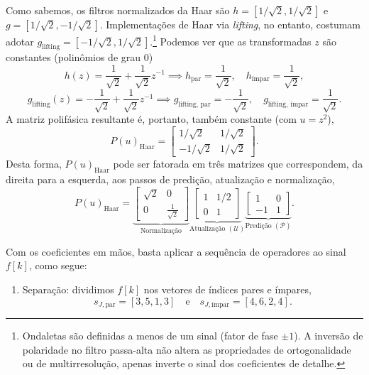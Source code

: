 \begin{example}
    Como sabemos, os filtros normalizados da Haar são \(h = [1/\sqrt{2}, 1/\sqrt{2}]\) e \(g = [1/\sqrt{2}, -1/\sqrt{2}]\). 
    Implementações de Haar via \emph{lifting}, no entanto, costumam adotar \(g_{\text{lifting}} = [- 1/\sqrt{2}, 1/\sqrt{2}]\).\footnote{Ondaletas são definidas a menos de um sinal (fator de fase \(\pm 1\)). A inversão de polaridade no filtro passa-alta não altera as propriedades de ortogonalidade ou de multirresolução, apenas inverte o sinal dos coeficientes de detalhe.} Podemos ver que as transformadas \(z\) são constantes (polinômios de grau 0)
		\[ 
            h(z) = \frac{1}{\sqrt{2}} + \frac{1}{\sqrt{2}}z^{-1} \implies h_\text{par} = \frac{1}{\sqrt{2}}, \quad h_\text{ímpar} = \frac{1}{\sqrt{2}},
        \]
		\[ 
            g_{\text{lifting}}(z) = -\frac{1}{\sqrt{2}} + \frac{1}{\sqrt{2}}z^{-1} \implies g_\text{lifting, par} = - \frac{1}{\sqrt{2}}, \quad g_\text{lifting, ímpar} = \frac{1}{\sqrt{2}}. 
        \]
A matriz polifásica resultante é, portanto, também constante (com \(u=z^2\)),
	\[
        P(u)_{\text{Haar}} = \begin{bmatrix}
        1/\sqrt{2} & 1/\sqrt{2} \\
        -1/\sqrt{2} & 1/\sqrt{2}
        \end{bmatrix}.
    \]
Desta forma, \(P(u)_{\text{Haar}}\) pode ser fatorada em três matrizes que correspondem, da direita para a esquerda, aos passos de predição, atualização e normalização,
\begin{equation*}
        P(u)_{\text{Haar}} = \underbrace{\begin{bmatrix} \sqrt{2} & 0 \\ 0 & \frac{1}{\sqrt{2}} \end{bmatrix}}_{\text{Normalização}} \underbrace{\begin{bmatrix} 1 & 1/2 \\ 0 & 1 \end{bmatrix}}_{\text{Atualização } (\mathcal{U})} \underbrace{\begin{bmatrix} 1 & 0 \\ -1 & 1 \end{bmatrix}}_{\text{Predição } (\mathcal{P})}.
    \end{equation*}

    Com os coeficientes em mãos, basta aplicar a sequência de operadores ao sinal \(f[k]\), como segue:

    \begin{enumerate}
        \item Separação: dividimos \(f[k]\) nos vetores de índices pares e ímpares,
		\[ 
        	s_{J, \text{par}} = [3, 5, 1, 3] \quad \text{e} \quad s_{J, \text{ímpar}} = [4, 6, 2, 4]. 
        \]


\end{enumerate}
\end{example}
